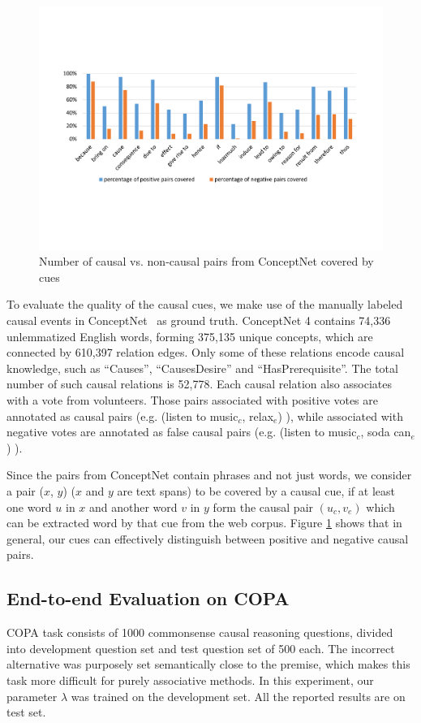 \documentclass[letterpaper]{article}
\newcommand{\figref}[1]{Figure \ref{#1}}
\begin{document}
\begin{figure}[th]
\centering
\includegraphics[width=1.6\columnwidth]{pattern2}
\caption{Number of causal vs. non-causal pairs from ConceptNet covered by cues}
\label{fig:pattern2}
\end{figure}
To evaluate the quality of the causal cues, we make use of the
manually labeled causal events in
ConceptNet~\cite{liu2004commonsense} as ground truth. ConceptNet 4
contains 74,336 unlemmatized English words, forming
375,135 unique concepts, which are connected by 610,397 relation edges.
Only some of these relations encode causal knowledge,
such as ``Causes'', ``CausesDesire'' and ``HasPrerequisite''.
The total number of such causal relations is 52,778.
Each causal relation also associates with a vote from volunteers.
Those pairs associated with positive votes are annotated as causal pairs
(e.g. (listen to music$_c$, relax$_e$) ),
while associated with negative votes are annotated as false causal pairs
(e.g. (listen to music$_c$, soda can$_e$) ).

Since the pairs from ConceptNet contain
phrases and not just words, we consider a pair ($x$, $y$)
($x$ and $y$ are text spans) to be covered by a
causal cue, if at least one word $u$ in $x$ and another word $v$ in
$y$ form the causal pair $(u_c,v_e)$ which can be extracted word by that cue
from the web corpus.
\figref{fig:pattern2} shows that in general, our cues can
effectively distinguish between positive and negative causal pairs.

\subsection{End-to-end Evaluation on COPA}
COPA task consists of 1000 commonsense causal reasoning questions, divided into
development question set and test question set of 500 each.
The incorrect alternative was purposely set semantically
close to the premise, which makes this task more difficult for
purely associative methods. In this experiment, our parameter $\lambda$
was trained on the development set.
All the reported results are on test set.
\end{document}
